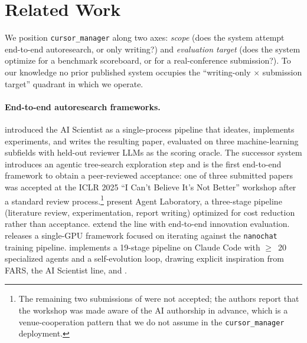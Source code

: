 \section{Related Work}
\label{sec:related}

We position \texttt{cursor\_manager} along two axes: \emph{scope} (does
the system attempt end-to-end autoresearch, or only writing?) and
\emph{evaluation target} (does the system optimize for a benchmark
scoreboard, or for a real-conference submission?). To our knowledge no
prior published system occupies the ``writing-only \(\times\)
submission target'' quadrant in which we operate.

\paragraph{End-to-end autoresearch frameworks.}
\citet{lu2024aiscientist} introduced the AI Scientist as a
single-process pipeline that ideates, implements experiments, and writes
the resulting paper, evaluated on three machine-learning subfields with
held-out reviewer LLMs as the scoring oracle. The successor system
\citet{yamada2025aiscientistv2} introduces an agentic tree-search
exploration step and is the first end-to-end framework to obtain a
peer-reviewed acceptance: one of three submitted papers was accepted at
the ICLR 2025 ``I Can't Believe It's Not Better'' workshop after a
standard review process.\footnote{The remaining two submissions of
\citet{yamada2025aiscientistv2} were not accepted; the authors report
that the workshop was made aware of the AI authorship in advance, which
is a venue-cooperation pattern that we do not assume in the
\texttt{cursor\_manager} deployment.} \citet{schmidgall2025agentlaboratory}
present Agent Laboratory, a three-stage pipeline (literature review,
experimentation, report writing) optimized for cost reduction rather
than acceptance. \citet{tang2025airesearcher} extend the line with
end-to-end innovation evaluation.
\citet{karpathy2026autoresearch} releases a single-GPU framework
focused on iterating against the \texttt{nanochat} training pipeline.
\citet{sibyl2026system} implements a 19-stage pipeline on Claude Code
with $\geq$~20 specialized agents and a self-evolution loop, drawing
explicit inspiration from FARS, the AI Scientist line, and
\citet{karpathy2026autoresearch}.

